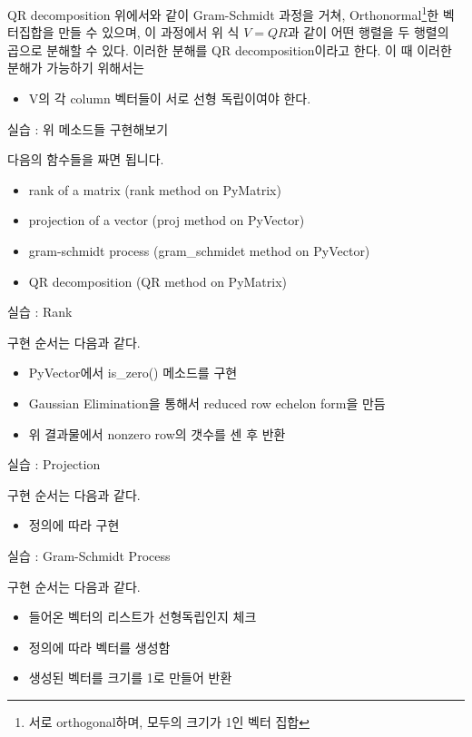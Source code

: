 \documentclass{beamer}
\begin{document}
\begin{frame}{QR decomposition} 
위에서와 같이 Gram-Schmidt 과정을 거쳐, Orthonormal\footnote{서로 orthogonal하며, 모두의 크기가 1인 벡터 집합}한 벡터집합을 만들 수 있으며, 이 과정에서 위 식 $V=QR$과 같이 어떤 행렬을 두 행렬의 곱으로 분해할 수 있다. 이러한 분해를 QR decomposition이라고 한다. 이 때 이러한 분해가 가능하기 위해서는 

\begin{itemize} 
\item V의 각 column 벡터들이 서로 선형 독립이여야 한다. 
\end{itemize}
\end{frame}

\begin{frame}{실습 : 위 메소드들 구현해보기} 

다음의 함수들을 짜면 됩니다. 

\begin{itemize} 
\item rank of a matrix (rank method on PyMatrix)
\item projection of a vector (proj method on PyVector)
\item gram-schmidt process (gram\_schmidet method on PyVector)
\item QR decomposition (QR method on PyMatrix)
\end{itemize}

\end{frame}


\begin{frame}{실습 : Rank}

구현 순서는 다음과 같다. 
\begin{itemize} 
\item PyVector에서 is\_zero() 메소드를 구현 
\item Gaussian Elimination을 통해서 reduced row echelon form을 만듬 
\item 위 결과물에서 nonzero row의 갯수를 센 후 반환
\end{itemize}
\end{frame}


\begin{frame}{실습 : Projection}

구현 순서는 다음과 같다. 
\begin{itemize} 
\item 정의에 따라 구현 
\end{itemize}
\end{frame}


\begin{frame}{실습 : Gram-Schmidt Process}

구현 순서는 다음과 같다. 
\begin{itemize} 
\item 들어온 벡터의 리스트가 선형독립인지 체크 
\item 정의에 따라 벡터를 생성함
\item 생성된 벡터를 크기를 1로 만들어 반환 
\end{itemize}
\end{frame}
\end{document}
